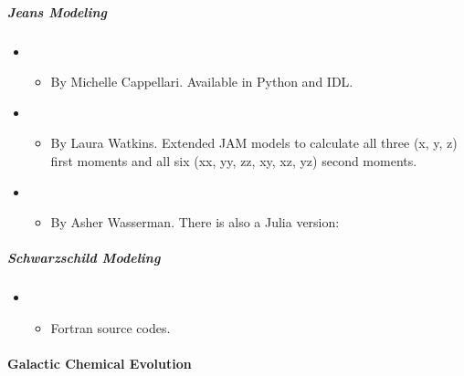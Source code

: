 \documentclass[letterpaper,10pt,english]{sphinxmanual}
\begin{document}
\subparagraph{Jeans Modeling}
\label{\detokenize{resource/astro/topics/galactic_astronomy:jeans-modeling}}\begin{itemize}
\item {} 
\begin{itemize}
\item {} 
By Michelle Cappellari. Available in Python and IDL.

\end{itemize}

\item {} 
\begin{itemize}
\item {} 
By Laura Watkins. Extended JAM models to calculate all three (x,
y, z) first moments and all six (xx, yy, zz, xy, xz, yz) second
moments.

\end{itemize}

\item {} 
\begin{itemize}
\item {} 
By Asher Wasserman. There is also a Julia version:

\end{itemize}

\end{itemize}


\subparagraph{Schwarzschild Modeling}
\label{\detokenize{resource/astro/topics/galactic_astronomy:schwarzschild-modeling}}\begin{itemize}
\item {} 
\begin{itemize}
\item {} 
Fortran source codes.

\end{itemize}

\end{itemize}


\paragraph{Galactic Chemical Evolution}
\label{\detokenize{resource/astro/topics/galactic_astronomy:galactic-chemical-evolution}}
\end{document}
